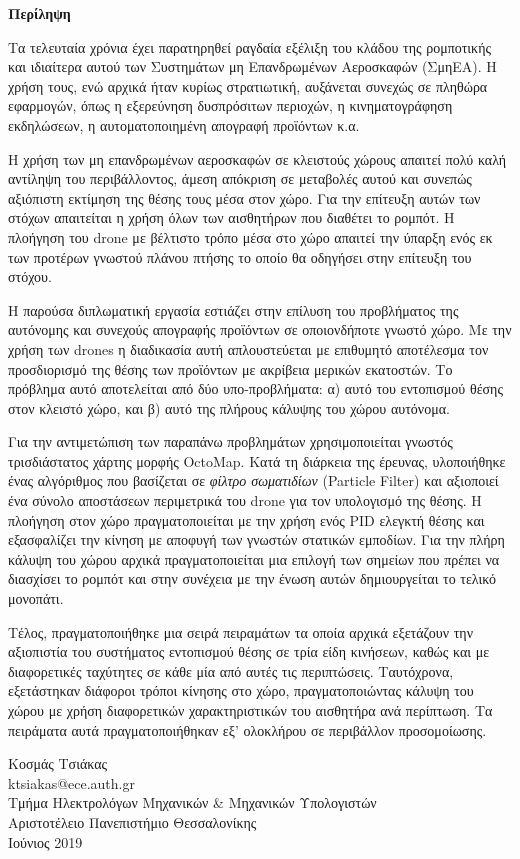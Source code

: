 \begin{center}
  \centering

  \vspace{0.5cm}
  \centering
  \textbf{\Large{Περίληψη}}

  \vspace{1cm}

\end{center}

Τα τελευταία χρόνια έχει παρατηρηθεί ραγδαία εξέλιξη του κλάδου της ρομποτικής και ιδιαίτερα αυτού των Συστημάτων μη Επανδρωμένων Αεροσκαφών (ΣμηΕΑ). Η χρήση τους, ενώ αρχικά ήταν κυρίως στρατιωτική, αυξάνεται συνεχώς σε πληθώρα εφαρμογών, όπως η εξερεύνηση δυσπρόσιτων περιοχών, η κινηματογράφηση εκδηλώσεων, η αυτοματοποιημένη απογραφή προϊόντων κ.α. 

Η χρήση των μη επανδρωμένων αεροσκαφών σε κλειστούς χώρους απαιτεί πολύ καλή αντίληψη του περιβάλλοντος, άμεση απόκριση σε μεταβολές αυτού και συνεπώς αξιόπιστη εκτίμηση της θέσης τους μέσα στον χώρο. Για την επίτευξη αυτών των στόχων απαιτείται η χρήση όλων των αισθητήρων που διαθέτει το ρομπότ. Η πλοήγηση του drone με βέλτιστο τρόπο μέσα στο χώρο απαιτεί την ύπαρξη ενός εκ των προτέρων γνωστού πλάνου πτήσης το οποίο θα οδηγήσει στην επίτευξη του στόχου.

Η παρούσα διπλωματική εργασία εστιάζει στην επίλυση του προβλήματος της αυτόνομης και συνεχούς απογραφής προϊόντων σε οποιονδήποτε γνωστό χώρο. Με την χρήση των drones η διαδικασία αυτή απλουστεύεται με επιθυμητό αποτέλεσμα τον προσδιορισμό της θέσης των προϊόντων με ακρίβεια μερικών εκατοστών. Το πρόβλημα αυτό αποτελείται από δύο υπο-προβλήματα: α) αυτό του εντοπισμού θέσης στον κλειστό χώρο, και β) αυτό της πλήρους κάλυψης του χώρου αυτόνομα.     

Για την αντιμετώπιση των παραπάνω προβλημάτων χρησιμοποιείται γνωστός τρισδιάστατος χάρτης μορφής OctoMap. Κατά τη διάρκεια της έρευνας, υλοποιήθηκε ένας αλγόριθμος που βασίζεται σε \emph{φίλτρο σωματιδίων} (Particle Filter) και αξιοποιεί ένα σύνολο αποστάσεων περιμετρικά του drone για τον υπολογισμό της θέσης. Η πλοήγηση στον χώρο πραγματοποιείται με την χρήση ενός PID ελεγκτή θέσης και εξασφαλίζει την κίνηση με αποφυγή των γνωστών στατικών εμποδίων. Για την πλήρη κάλυψη του χώρου αρχικά πραγματοποιείται μια επιλογή των σημείων που πρέπει να διασχίσει το ρομπότ και στην συνέχεια με την ένωση αυτών δημιουργείται το τελικό μονοπάτι.

Τέλος, πραγματοποιήθηκε μια σειρά πειραμάτων τα οποία αρχικά εξετάζουν την αξιοπιστία του συστήματος εντοπισμού θέσης σε τρία είδη κινήσεων, καθώς και με διαφορετικές ταχύτητες σε κάθε μία από αυτές τις περιπτώσεις. Ταυτόχρονα, εξετάστηκαν διάφοροι τρόποι κίνησης στο χώρο, πραγματοποιώντας κάλυψη του χώρου με χρήση διαφορετικών χαρακτηριστικών του αισθητήρα ανά περίπτωση. Τα πειράματα αυτά πραγματοποιήθηκαν εξ' ολοκλήρου σε περιβάλλον προσομοίωσης.

\begin{flushright}
  \vspace{2cm}
  Κοσμάς Τσιάκας
  \\
  ktsiakas@ece.auth.gr
  \\
  Τμήμα Ηλεκτρολόγων Μηχανικών \& Μηχανικών Υπολογιστών
  \\
  Αριστοτέλειο Πανεπιστήμιο Θεσσαλονίκης
  \\
  Ιούνιος 2019
\end{flushright}